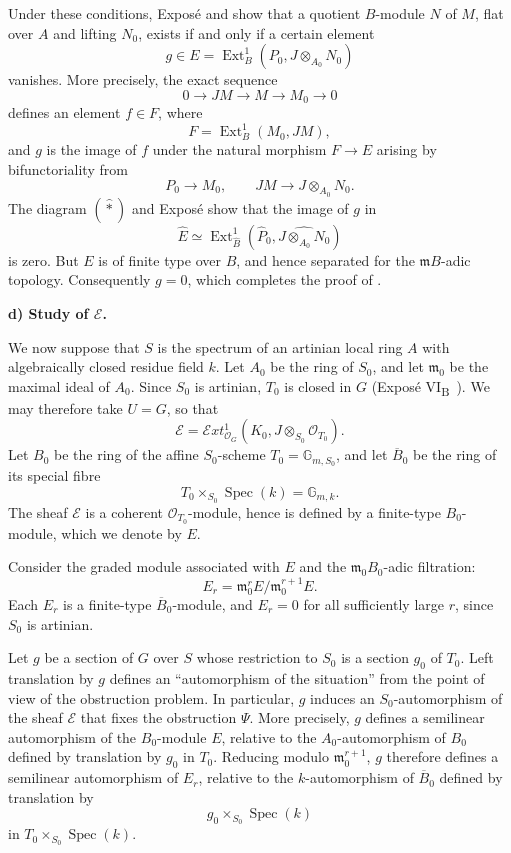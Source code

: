 Under these conditions, Exposé  and  show that a quotient
\(B\)-module \(N\) of \(M\), flat over \(A\) and lifting \(N_0\),
exists if and only if a certain element
\[
  g\in E=\operatorname{Ext}^{1}_B
  (P_0,J\otimes_{A_0}N_0)
\]
vanishes. More precisely, the exact sequence
\[
  0\longrightarrow JM\longrightarrow M
  \longrightarrow M_0\longrightarrow0
\]
defines an element \(f\in F\), where
\[
  F=\operatorname{Ext}^{1}_B(M_0,JM),
\]
and \(g\) is the image of \(f\) under the natural morphism \(F\to E\)
arising by bifunctoriality from
\[
  P_0\longrightarrow M_0,
  \qquad
  JM\longrightarrow J\otimes_{A_0}N_0.
\]
The diagram \((\widehat\ast)\) and Exposé  show that the image
of \(g\) in
\[
  \widehat E\simeq
  \operatorname{Ext}^{1}_{\widehat B}
  (\widehat P_0,\widehat{J\otimes_{A_0}N_0})
\]
is zero. But \(E\) is of finite type over \(B\), and hence separated
for the \(\mathfrak mB\)-adic topology. Consequently \(g=0\), which
completes the proof of .

\medskip\noindent\textbf{d) Study of \(\boldsymbol{\mathscr E}\).}

We now suppose that \(S\) is the spectrum of an artinian local ring
\(A\) with algebraically closed residue field \(k\). Let \(A_0\) be
the ring of \(S_0\), and let \(\mathfrak m_0\) be the maximal ideal
of \(A_0\). Since \(S_0\) is artinian, \(T_0\) is closed in \(G\)
(Exposé VI\textsubscript{B}~). We may therefore take \(U=G\), so
that
\[
  \mathscr E=
  \mathcal Ext^{1}_{\mathcal O_G}
  (K_0,J\otimes_{S_0}\mathcal O_{T_0}).
\]
Let \(B_0\) be the ring of the affine \(S_0\)-scheme
\(T_0=\mathbb G_{m,S_0}\), and let \(\overline B_0\) be the ring of its special
fibre
\[
  T_0\times_{S_0}\operatorname{Spec}(k)=\mathbb G_{m,k}.
\]
The sheaf \(\mathscr E\) is a coherent
\(\mathcal O_{T_0}\)-module, hence is defined by a finite-type
\(B_0\)-module, which we denote by \(E\).

Consider the graded module associated with \(E\) and the
\(\mathfrak m_0B_0\)-adic filtration:
\[
  E_r=\mathfrak m_0^rE/\mathfrak m_0^{r+1}E.
\]
Each \(E_r\) is a finite-type \(\overline B_0\)-module, and \(E_r=0\) for all
sufficiently large \(r\), since \(S_0\) is artinian.

Let \(g\) be a section of \(G\) over \(S\) whose restriction to
\(S_0\) is a section \(g_0\) of \(T_0\). Left translation by \(g\)
defines an ``automorphism of the situation'' from the point of view
of the obstruction problem. In particular, \(g\) induces an
\(S_0\)-automorphism of the sheaf \(\mathscr E\) that fixes the
obstruction \(\Psi\). More precisely, \(g\) defines a semilinear
automorphism of the \(B_0\)-module \(E\), relative to the
\(A_0\)-automorphism of \(B_0\) defined by translation by \(g_0\) in
\(T_0\). Reducing modulo \(\mathfrak m_0^{r+1}\), \(g\) therefore
defines a semilinear automorphism of \(E_r\), relative to the
\(k\)-automorphism of \(\overline B_0\) defined by translation by
\[
  g_0\times_{S_0}\operatorname{Spec}(k)
\]
in \(T_0\times_{S_0}\operatorname{Spec}(k)\).

